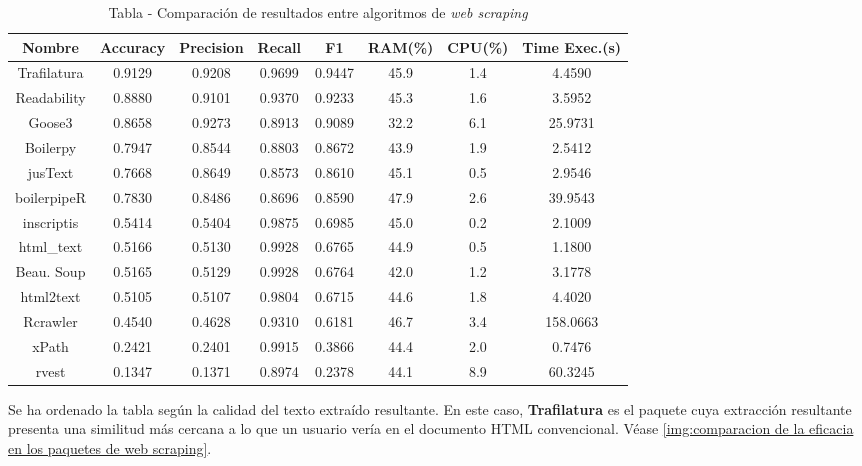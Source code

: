 \begin{table}[h]
    \begin{center}
      \begin{tabular}{| c | c | c | c | c | c | c | c |} \hline 
       \textbf{Nombre} & \textbf{Accuracy} & \textbf{Precision}  & \textbf{Recall} & \textbf{F1} & \textbf{RAM(\%)} & \textbf{CPU(\%)} & \textbf{Time Exec.(s)} \\ \hline
       Trafilatura & 0.9129 & 0.9208 & 0.9699 & 0.9447 & 45.9 & 1.4 & 4.4590 \\ \hline
       Readability & 0.8880 & 0.9101 & 0.9370 & 0.9233 & 45.3 & 1.6 & 3.5952 \\ \hline
       Goose3 & 0.8658 & 0.9273 & 0.8913 & 0.9089 & 32.2 & 6.1 & 25.9731 \\ \hline
       Boilerpy & 0.7947 & 0.8544 & 0.8803 & 0.8672 & 43.9 & 1.9 & 2.5412 \\ \hline
       jusText & 0.7668 & 0.8649 & 0.8573 & 0.8610 & 45.1 & 0.5 & 2.9546 \\ \hline
       boilerpipeR & 0.7830 & 0.8486 & 0.8696 & 0.8590 & 47.9 & 2.6 & 39.9543 \\ \hline
       inscriptis & 0.5414 & 0.5404 & 0.9875 & 0.6985 & 45.0 & 0.2 & 2.1009 \\ \hline
       html\_text & 0.5166 & 0.5130 & 0.9928 & 0.6765 & 44.9 & 0.5 & 1.1800 \\ \hline
       Beau. Soup & 0.5165 & 0.5129 & 0.9928 & 0.6764 & 42.0 & 1.2 & 3.1778 \\ \hline
       html2text & 0.5105 & 0.5107 & 0.9804 & 0.6715 & 44.6 & 1.8 & 4.4020 \\ \hline
       Rcrawler & 0.4540 & 0.4628 & 0.9310 & 0.6181 & 46.7 & 3.4 & 158.0663 \\ \hline
       xPath & 0.2421 & 0.2401 & 0.9915 & 0.3866 & 44.4 & 2.0 & 0.7476 \\ \hline
       rvest & 0.1347 & 0.1371 & 0.8974 & 0.2378 & 44.1 & 8.9 & 60.3245 \\ \hline
      \end{tabular}
      \caption{Tabla - Comparación de resultados entre algoritmos de \emph{web scraping}}
      \label{tab:tabla - comparacion de resultados entre algoritmos de web scraping}
    \end{center}
\end{table}

Se ha ordenado la tabla según la calidad del texto extraído resultante. En este caso, \textbf{Trafilatura}
es el paquete cuya extracción resultante presenta una similitud más cercana a lo que un usuario vería en
el documento HTML convencional. Véase \ref{img:comparacion de la eficacia en los paquetes de web scraping}.


